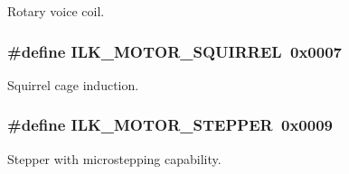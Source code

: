 Rotary voice coil. 

\subsubsection[{\texorpdfstring{I\+L\+K\+\_\+\+M\+O\+T\+O\+R\+\_\+\+S\+Q\+U\+I\+R\+R\+EL}{ILK_MOTOR_SQUIRREL}}]{\setlength{\rightskip}{0pt plus 5cm}\#define I\+L\+K\+\_\+\+M\+O\+T\+O\+R\+\_\+\+S\+Q\+U\+I\+R\+R\+EL~0x0007}\hypertarget{group__IL__CONST__MOTOR_ga5bdb2f869123533b63941efbb1a7aea3}{}\label{group__IL__CONST__MOTOR_ga5bdb2f869123533b63941efbb1a7aea3}


Squirrel cage induction. 

\subsubsection[{\texorpdfstring{I\+L\+K\+\_\+\+M\+O\+T\+O\+R\+\_\+\+S\+T\+E\+P\+P\+ER}{ILK_MOTOR_STEPPER}}]{\setlength{\rightskip}{0pt plus 5cm}\#define I\+L\+K\+\_\+\+M\+O\+T\+O\+R\+\_\+\+S\+T\+E\+P\+P\+ER~0x0009}\hypertarget{group__IL__CONST__MOTOR_ga13f49aebf7a4d08b01a9c7aa00164ead}{}\label{group__IL__CONST__MOTOR_ga13f49aebf7a4d08b01a9c7aa00164ead}


Stepper with microstepping capability. 

